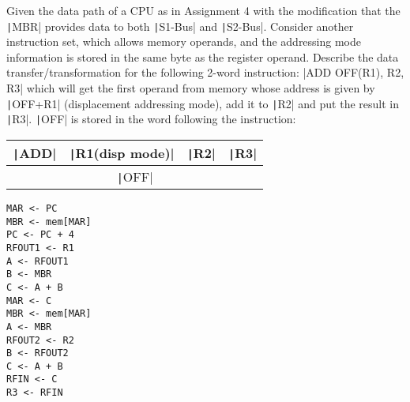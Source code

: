 \documentclass[answers]{exam}
\begin{document}
\begin{questions}
\begin{solution}
    \end{solution}

    \pagebreak
    \question Given the data path of a CPU as in Assignment 4 with the modification that the \texttt|MBR| provides data to both \texttt|S1-Bus| and \texttt|S2-Bus|. Consider another instruction set, which allows memory operands, and the addressing mode information is stored in the same byte as the register operand. Describe the data transfer/transformation for the following 2-word instruction:
    |ADD     OFF(R1), R2, R3|
    which will get the first operand from memory whose address is given by \texttt|OFF+R1| (displacement addressing mode), add it to \texttt|R2| and put the result in \texttt|R3|. \texttt|OFF| is stored in the word following the instruction:
    \begin{table}[htbp]
        \centering
        \begin{tabular}{|c|c|c|c|}
            \hline
            \texttt|ADD|
             & \texttt|R1(disp mode)|
             & \texttt|R2|
             & \texttt|R3|                     \\
            \hline\hline
            \multicolumn{4}{|c|}{\texttt|OFF|} \\ \hline
        \end{tabular}
    \end{table}

    \begin{solution}
        \begin{verbatim}
MAR <- PC
MBR <- mem[MAR]
PC <- PC + 4
RFOUT1 <- R1
A <- RFOUT1
B <- MBR
C <- A + B
MAR <- C
MBR <- mem[MAR]
A <- MBR
RFOUT2 <- R2
B <- RFOUT2
C <- A + B
RFIN <- C
R3 <- RFIN
        \end{verbatim}
    \end{solution}

\end{questions}
\end{document}
